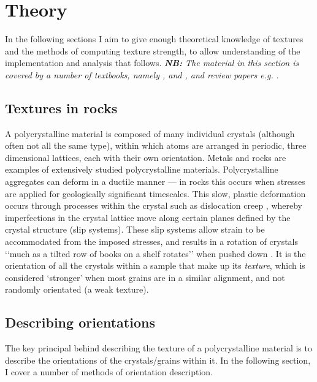\documentclass[a4paper,12pt,twoside]{report}
\numberwithin{equation}{chapter}
\begin{document}
\chapter{Theory} \label{chap:theory}
\vspace{-1cm}
In the following sections I aim to give enough theoretical knowledge of textures and the methods of computing texture strength, to allow understanding of the implementation and analysis that follows. \emph{\textbf{NB:} The material in this section is covered by a number of textbooks, namely \cite{bunge1982texture}, \cite{Bunge1985} and \cite{Randle2000}, and review papers e.g. \cite{Mainprice}}.


\section{Textures in rocks} 
A polycrystalline material is composed of many individual crystals (although often not all the same type), within which atoms are arranged in periodic, three dimensional lattices, each with their own orientation. Metals and rocks are examples of extensively studied polycrystalline materials. Polycrystalline aggregates can deform in a ductile manner --- in rocks this occurs when stresses are applied for geologically significant timescales. This slow, plastic deformation occurs through processes within the crystal such as dislocation creep \citep{Ashby1972},  whereby imperfections in the crystal lattice move along certain planes defined by the crystal structure (slip systems). These slip systems allow strain to be accommodated from the imposed stresses, and results in a rotation of crystals \lq\lq{}much as a tilted row of books on a shelf rotates\rq\rq{} when pushed down \citep{Goulding2015}. It is the orientation of all the crystals within a sample that make up its \emph{texture}, which is considered \lq{}stronger\rq{} when most grains are in a similar alignment, and not randomly orientated (a weak texture).       


\section{Describing orientations} \label{sec:orientations}
The key principal behind describing the texture of a polycrystalline material is to describe the orientations of the crystals/grains within it. In the following section, I cover a number of methods of orientation description.
\end{document}
